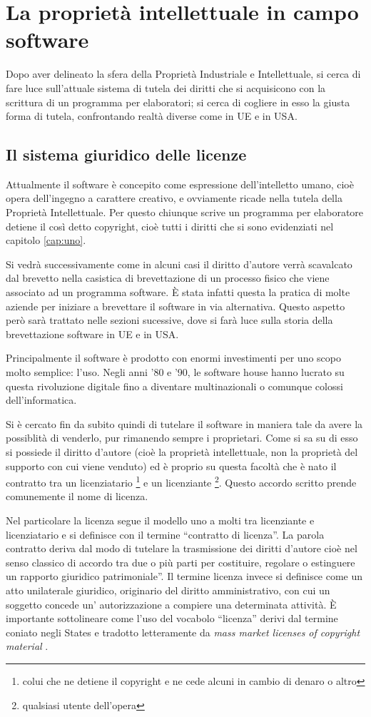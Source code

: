 \chapter{La proprietà intellettuale in campo software}
Dopo aver delineato la sfera della Proprietà Industriale e Intellettuale, si cerca di fare luce sull'attuale sistema di tutela dei diritti che si acquisicono con la scrittura di un programma per elaboratori; si cerca di cogliere in esso la giusta forma di tutela, confrontando realtà diverse come in UE e in USA.

\section{Il sistema giuridico delle licenze}
Attualmente il software è concepito come espressione dell'intelletto umano, cioè opera dell'ingegno a carattere creativo, e ovviamente ricade nella tutela della Proprietà Intellettuale. Per questo chiunque scrive un programma per elaboratore detiene il così detto copyright, cioè tutti i diritti che si sono evidenziati nel capitolo \ref{cap:uno}.

Si vedrà successivamente come in alcuni casi il diritto d'autore verrà scavalcato dal brevetto nella casistica di brevettazione di un processo fisico che viene associato ad un programma software. \`E stata infatti questa la pratica di molte aziende per iniziare a brevettare il software in via alternativa. Questo aspetto però sarà trattato nelle sezioni sucessive, dove si farà luce sulla storia della brevettazione software in UE e in USA.

Principalmente il software è prodotto con enormi investimenti per uno scopo molto semplice: l'uso. Negli anni '80 e '90, le software house hanno lucrato su questa rivoluzione digitale fino a diventare multinazionali o comunque colossi dell'informatica.

Si è cercato fin da subito quindi di tutelare il software in maniera tale da avere la possiblità di venderlo, pur rimanendo sempre i proprietari. Come si sa su di esso si possiede il diritto d'autore (cioè la proprietà intellettuale, non la proprietà del supporto con cui viene venduto) ed è proprio su questa facoltà che è nato il contratto tra un licenziatario \footnote{colui che ne detiene il copyright e ne cede alcuni in cambio di denaro o altro} e un licenziante \footnote{qualsiasi utente dell'opera}. Questo accordo scritto prende comunemente il nome di licenza.

Nel particolare la licenza segue il modello uno a molti tra licenziante e licenziatario e si definisce con il termine ``contratto di licenza''. La parola contratto deriva dal modo di tutelare la trasmissione dei diritti d'autore cioè nel senso classico di accordo  tra due o più parti per costituire, regolare o estinguere un rapporto giuridico patrimoniale”.
Il termine licenza invece si definisce come un atto unilaterale giuridico, originario del diritto amministrativo, con cui un soggetto concede un' autorizzazione a compiere una determinata attività. \`E importante sottolineare come l'uso del vocabolo ``licenza'' derivi dal termine coniato negli States e tradotto letteramente da \textit{mass market licenses of copyright material }.

